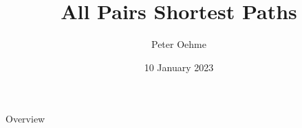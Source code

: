 

\author{Peter Oehme}
\title{All Pairs Shortest Paths}
\date{10 January 2023}



\begin{frame}
    \maketitle
\end{frame}

\begin{frame}{Overview}
    \tableofcontents
\end{frame}







